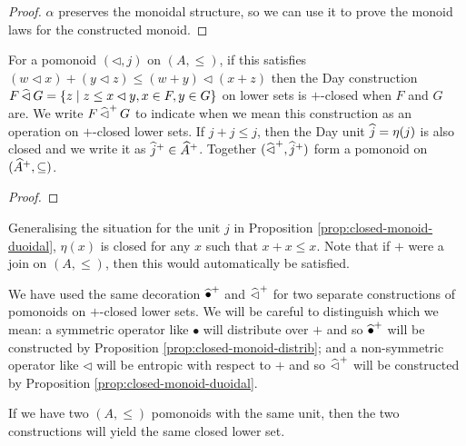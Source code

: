 \begin{proof}
  $\alpha$ preserves the monoidal structure, so we can use it to prove
  the monoid laws for the constructed monoid.

\end{proof}

\begin{proposition}\label{prop:closed-monoid-duoidal}
  For a pomonoid $(\lhd, j)$ on $(A, \leq)$, if this satisfies
  $(w \lhd x) + (y \lhd z) \leq (w + y) \lhd (x + z)$ then the Day
  construction
  $F \mathop{\widehat{\lhd}} G = \{ z \mid z \leq x \lhd y, x \in F, y \in G \}$ on
  lower sets is $+$-closed when $F$ and $G$ are. We write
  $F \mathop{\widehat{\lhd}^+} G$ to indicate when we mean this construction as
  an operation on $+$-closed lower sets. If $j + j \leq j$, then the
  Day unit $\mathop{\widehat{j}} = \eta(j)$ is also closed and we write it as
  $\mathop{\widehat{j}^+} \in \widehat{A}^+$. Together
  $(\mathop{\widehat{\lhd}^+}, \mathop{\widehat{j}^+})$ form a pomonoid on
  $(\widehat{A}^+, \subseteq)$.
\end{proposition}

\begin{proof}
\end{proof}

\begin{remark}
  Generalising the situation for the unit $j$ in Proposition
  \ref{prop:closed-monoid-duoidal}, $\eta(x)$ is closed for any $x$
  such that $x + x \leq x$. Note that if $+$ were a join on
  $(A, \leq)$, then this would automatically be satisfied.
\end{remark}

\begin{remark}
  We have used the same decoration $\mathop{\widehat{\bullet}^+}$ and
  $\mathop{\widehat{\lhd}^+}$ for two separate constructions of pomonoids on
  $+$-closed lower sets. We will be careful to distinguish which we
  mean: a symmetric operator like $\bullet$ will distribute over $+$
  and so $\mathop{\widehat{\bullet}^+}$ will be constructed by Proposition
  \ref{prop:closed-monoid-distrib}; and a non-symmetric operator like
  $\lhd$ will be entropic with respect to $+$ and so
  $\mathop{\widehat{\lhd}^+}$ will be constructed by Proposition
  \ref{prop:closed-monoid-duoidal}.
\end{remark}

\begin{remark}
  If we have two $(A, \leq)$ pomonoids with the same unit, then the
  two constructions will yield the same closed lower set.
\end{remark}

